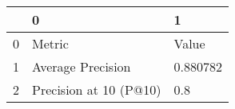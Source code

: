 \begin{tabular}{lll}
\toprule
{} &                       0 &         1 \\
\midrule
0 &                  Metric &     Value \\
1 &       Average Precision &  0.880782 \\
2 &  Precision at 10 (P@10) &       0.8 \\
\bottomrule
\end{tabular}
